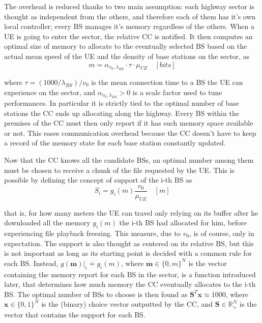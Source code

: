 \documentclass[conference,10pt]{IEEEtran}
\begin{document}
The overhead is reduced thanks to two main assumption: each highway sector is thought as independent from the others, and therefore each of them has it's own local controller; every BS manages it's memory regardless of the others. When a UE is going to enter the sector, the relative CC is notified. It then computes an optimal size of memory to allocate to the eventually selected BS based on the actual mean speed of the UE and the density of base stations on the sector, as
\begin{equation}
m = \alpha_{v_0, \lambda_{B\!S}} \cdot \tau \cdot \mu_{U\!E} \quad [bits]
\end{equation}

where $\tau = (1000/\lambda_{B\!S})/v_0$ is the mean connection time to a BS the UE can experience on the sector, and $\alpha_{v_0, \lambda_{B\!S}} > 0$ is a scale factor used to tune performances. In particular it is strictly tied to the optimal number of base stations the CC ends up allocating along the highway. Every BS within the premises of the CC must then only report if it has such memory space available or not. This eases communication overhead because the CC doesn't have to keep a record of the memory state for each base station constantly updated.

Now that the CC knows all the candidate BSs, an optimal number among them must be chosen to receive a chunk of the file requested by the UE. This is possible by defining the concept of support of the i-th BS as
\begin{equation}
\label{eq:support-region}
S_i = g_i(m)\frac{v_0}{\mu_{U\!E}} \quad [m]
\end{equation}

that is, for how many meters the UE can travel only relying on its buffer after he downloaded all the memory $g_i(m)$ the i-th BS had allocated for him, before experiencing file playback freezing. This measure, due to $v_0$, is of course, only in expectation. The support is also thought as centered on its relative BS, but this is not important as long as its starting point is decided with a common rule for each BS. Instead, $g(\mathbf{m})|_i \doteq g_i(m)$, where $\mathbf{m} \in \{0, m\}^N$ is the vector containing the memory report for each BS in the sector, is a function introduced later, that determines how much memory the CC eventually allocates to the i-th BS. The optimal number of BSs to choose is then found as $\mathbf{S}^T\mathbf{x} \approx 1000$, where $\mathbf{x} \in \{0,1\}^N$ is the (binary) choice vector outputted by the CC, and  $\mathbf{S} \in \mathbb{R}_+^N$ is the vector that contains the support for each BS.
\end{document}
